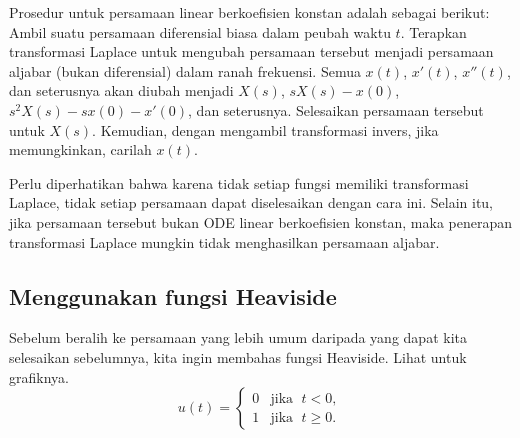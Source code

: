 Prosedur untuk persamaan linear berkoefisien konstan adalah sebagai berikut:
Ambil suatu persamaan diferensial biasa
dalam peubah waktu $t$.  Terapkan transformasi Laplace
untuk mengubah persamaan tersebut menjadi persamaan aljabar (bukan diferensial) dalam
ranah frekuensi.  Semua $x(t)$, $x'(t)$, $x''(t)$, dan seterusnya akan
diubah menjadi $X(s)$, $sX(s) - x(0)$, $s^2X(s) - sx(0) - x'(0)$,
dan seterusnya.
Selesaikan persamaan tersebut untuk $X(s)$.
Kemudian, dengan mengambil transformasi invers, jika memungkinkan, carilah $x(t)$.

Perlu diperhatikan bahwa karena tidak setiap fungsi memiliki transformasi Laplace,
tidak setiap persamaan dapat diselesaikan dengan cara ini.  Selain itu, jika persamaan
tersebut bukan ODE linear berkoefisien konstan\@,
maka penerapan transformasi Laplace mungkin tidak
menghasilkan persamaan aljabar.

\subsection{Menggunakan fungsi Heaviside}

Sebelum beralih ke persamaan yang lebih umum
daripada yang dapat kita selesaikan sebelumnya,
kita ingin membahas fungsi Heaviside.  Lihat 
untuk grafiknya.
\begin{equation*}
u(t) =
\begin{cases}
0 & \text{jika } \; t < 0 , \\ 
1 & \text{jika } \; t \geq 0 .
\end{cases}
\end{equation*}

\begin{myfig}
\capstart
{}
\caption{Grafik fungsi Heaviside (tangga satuan)
$u(t)$.\label{lt:heavisidefig}}
\end{myfig}

